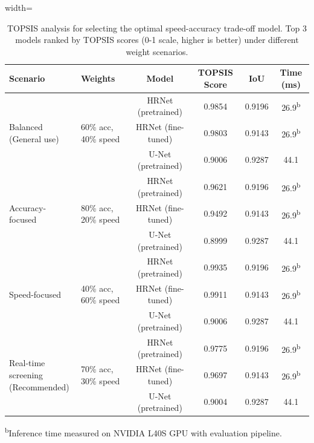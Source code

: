 \documentclass[preprint,12pt]{elsarticle}
\begin{document}
\begin{table}[h]
\centering
\caption{TOPSIS analysis for selecting the optimal speed-accuracy trade-off model. Top 3 models ranked by TOPSIS scores (0-1 scale, higher is better) under different weight scenarios.}
\label{tab:topsis}
\begin{adjustbox}{width=\textwidth}
\begin{tabular}{llcccc}
\toprule
\textbf{Scenario} & \textbf{Weights} & \textbf{Model} & \textbf{TOPSIS Score} & \textbf{IoU} & \textbf{Time (ms)} \\
\midrule
\multirow{3}{*}{\parbox{3cm}{Balanced\\(General use)}} & \multirow{3}{*}{60\% acc, 40\% speed} 
& HRNet (pretrained) & 0.9854 & 0.9196 & 26.9\textsuperscript{b} \\
& & HRNet (fine-tuned) & 0.9803 & 0.9143 & 26.9\textsuperscript{b} \\
& & U-Net (pretrained) & 0.9006 & 0.9287 & 44.1 \\
\hline
\multirow{3}{*}{\parbox{3cm}{Accuracy-focused}} & \multirow{3}{*}{80\% acc, 20\% speed} 
& HRNet (pretrained) & 0.9621 & 0.9196 & 26.9\textsuperscript{b} \\
& & HRNet (fine-tuned) & 0.9492 & 0.9143 & 26.9\textsuperscript{b} \\
& & U-Net (pretrained) & 0.8999 & 0.9287 & 44.1 \\
\hline
\multirow{3}{*}{\parbox{3cm}{Speed-focused}} & \multirow{3}{*}{40\% acc, 60\% speed} 
& HRNet (pretrained) & 0.9935 & 0.9196 & 26.9\textsuperscript{b} \\
& & HRNet (fine-tuned) & 0.9911 & 0.9143 & 26.9\textsuperscript{b} \\
& & U-Net (pretrained) & 0.9006 & 0.9287 & 44.1 \\
\hline
\multirow{3}{*}{\parbox{3cm}{Real-time screening\\(Recommended)}} & \multirow{3}{*}{70\% acc, 30\% speed} 
& HRNet (pretrained) & 0.9775 & 0.9196 & 26.9\textsuperscript{b} \\
& & HRNet (fine-tuned) & 0.9697 & 0.9143 & 26.9\textsuperscript{b} \\
& & U-Net (pretrained) & 0.9004 & 0.9287 & 44.1 \\
\bottomrule
\end{tabular}
\end{adjustbox}
\footnotesize{\textsuperscript{b}Inference time measured on NVIDIA L40S GPU with evaluation pipeline.}
\end{table}
\end{document}
